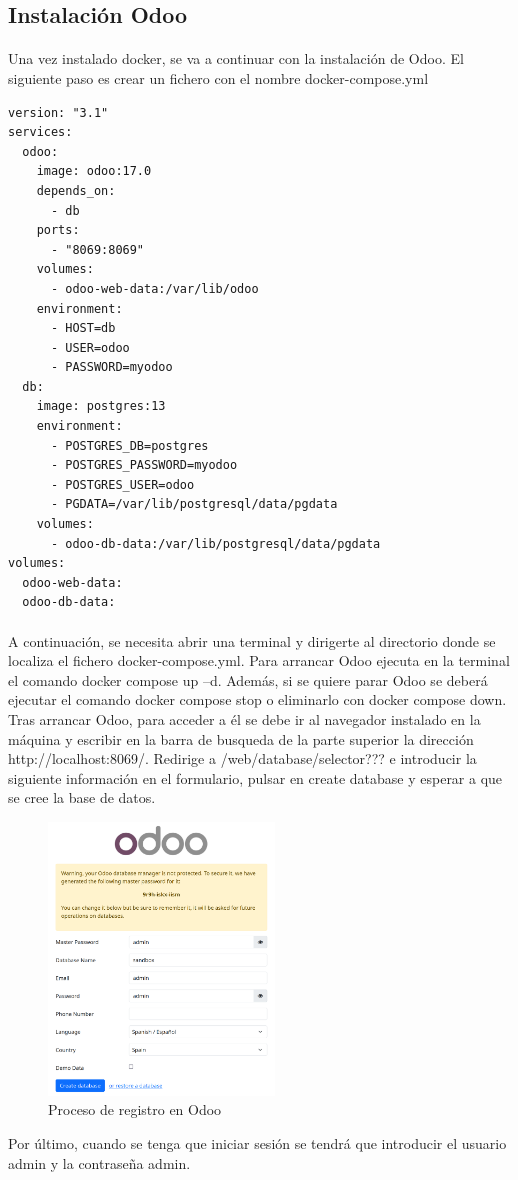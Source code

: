 \documentclass[paper=a4wide, fontsize=11pt]{report}	 %
\begin{document}
\subsection{Instalación Odoo}
\paragraph{}
Una vez instalado docker, se va a continuar con la instalación de Odoo. El siguiente paso es crear un fichero con el nombre docker-compose.yml
\begin{lstlisting}[frame=single, basicstyle=\small]
version: "3.1"
services:
  odoo:
    image: odoo:17.0
    depends_on:
      - db
    ports:
      - "8069:8069"
    volumes:
      - odoo-web-data:/var/lib/odoo
    environment:
      - HOST=db
      - USER=odoo
      - PASSWORD=myodoo
  db:
    image: postgres:13
    environment:
      - POSTGRES_DB=postgres
      - POSTGRES_PASSWORD=myodoo
      - POSTGRES_USER=odoo
      - PGDATA=/var/lib/postgresql/data/pgdata
    volumes:
      - odoo-db-data:/var/lib/postgresql/data/pgdata
volumes:
  odoo-web-data:
  odoo-db-data:
\end{lstlisting}
\paragraph{}
A continuación, se necesita abrir una terminal y dirigerte al directorio donde se localiza el fichero docker-compose.yml. Para arrancar Odoo ejecuta en la terminal el comando docker compose up –d. Además, si se quiere parar Odoo se deberá ejecutar el comando docker compose stop o eliminarlo con docker compose down. Tras arrancar Odoo, para acceder a él se debe ir al navegador instalado en la máquina y escribir en la barra de busqueda de la parte superior la dirección http://localhost:8069/.
Redirige a /web/database/selector??? e introducir la siguiente información en el formulario, pulsar en create database y esperar a que se cree la base de datos.
\begin{figure}[h]
    \centering
    \includegraphics[width=6cm]{signup.png}
    \caption{Proceso de registro en Odoo}
    \label{fig:signup}
\end{figure}
Por último, cuando se tenga que iniciar sesión se tendrá que introducir el usuario admin y la contraseña admin.
\end{document}
